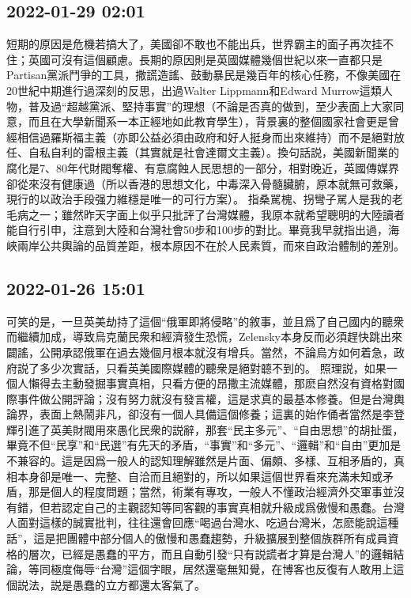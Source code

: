 \documentclass[twocolumn]{ctexart}
\begin{document}
\subsection*{2022-01-29 02:01}

短期的原因是危機若搞大了，美國卻不敢也不能出兵，世界霸主的面子再次挂不住；英國可沒有這個顧慮。長期的原因則是英國媒體幾個世紀以來一直都只是Partisan黨派鬥爭的工具，撒謊造謠、鼓動暴民是幾百年的核心任務，不像美國在20世紀中期進行過深刻的反思，出過Walter Lippmann和Edward Murrow這類人物，普及過“超越黨派、堅持事實”的理想（不論是否真的做到，至少表面上大家同意，而且在大學新聞系一本正經地如此教育學生），背景裏的整個國家社會更是曾經相信過羅斯福主義（亦即公益必須由政府和好人挺身而出來維持）而不是絕對放任、自私自利的雷根主義（其實就是社會達爾文主義）。換句話説，美國新聞業的腐化是7、80年代財閥奪權、有意腐蝕人民思想的一部分，相對晚近，英國傳媒界卻從來沒有健康過（所以香港的思想文化，中毒深入骨髓臟腑，原本就無可救藥，現行的以政治手段强力維穩是唯一的可行方案）。
指桑駡槐、拐彎子駡人是我的老毛病之一；雖然昨天字面上似乎只批評了台灣媒體，我原本就希望聰明的大陸讀者能自行引申，注意到大陸和台灣社會50步和100步的對比。畢竟我早就指出過，海峽兩岸公共輿論的品質差距，根本原因不在於人民素質，而來自政治體制的差別。
\subsection*{2022-01-26 15:01}

可笑的是，一旦英美劫持了這個“俄軍即將侵略”的敘事，並且爲了自己國内的聽衆而繼續加成，導致烏克蘭民衆和經濟發生恐慌，Zelensky本身反而必須趕快跳出來闢謠，公開承認俄軍在過去幾個月根本就沒有增兵。當然，不論烏方如何着急，政府説了多少次實話，只看英美國際媒體的聽衆是絕對聼不到的。
照理説，如果一個人懶得去主動發掘事實真相，只看方便的昂撒主流媒體，那麽自然沒有資格對國際事件做公開評論；沒有努力就沒有發言權，這是求真的最基本修養。但是台灣輿論界，表面上熱鬧非凡，卻沒有一個人具備這個修養；這裏的始作俑者當然是李登輝引進了英美財閥用來愚化民衆的説辭，那套“民主多元”、“自由思想”的胡扯蛋，畢竟不但“民享”和“民選”有先天的矛盾，“事實”和“多元”、“邏輯”和“自由”更加是不兼容的。這是因爲一般人的認知理解雖然是片面、偏頗、多樣、互相矛盾的，真相本身卻是唯一、完整、自洽而且絕對的，所以如果這個世界看來充滿未知或矛盾，那是個人的程度問題；當然，術業有專攻，一般人不懂政治經濟外交軍事並沒有錯，但若認定自己的主觀認知等同客觀的事實真相就升級成爲傲慢和愚蠢。台灣人面對這樣的誠實批判，往往還會回應“喝過台灣水、吃過台灣米，怎麽能說這種話”，這是把團體中部分個人的傲慢和愚蠢趨勢，升級擴展到整個族群所有成員資格的層次，已經是愚蠢的平方，而且自動引發“只有説謊者才算是台灣人”的邏輯結論，等同極度侮辱“台灣”這個字眼，居然還毫無知覺，在博客也反復有人敢用上這個説法，説是愚蠢的立方都還太客氣了。
\end{document}
